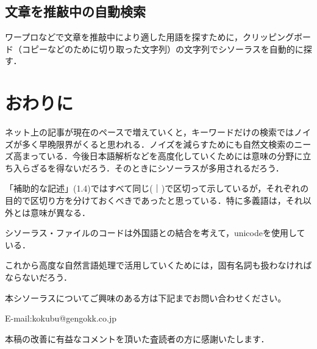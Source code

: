 \documentclass[japanese]{jnlp_1.4}
\begin{document}
\subsection{文章を推敲中の自動検索}

ワープロなどで文章を推敲中により適した用語を探すために，クリッピングボード（コピーなどのために切り取った文字列）の文字列でシソーラスを自動的に探す．


\section{おわりに}

ネット上の記事が現在のペースで増えていくと，キーワードだけの検索ではノイズが多く早晩限界がくると思われる．ノイズを減らすためにも自然文検索のニーズ高まっている．今後日本語解析などを高度化していくためには意味の分野に立ち入らざるを得ないだろう．そのときにシソーラスが多用されるだろう．

「補助的な記述」(1.4)ではすべて同じ(｜)で区切って示しているが，それぞれの目的で区切り方を分けておくべきであったと思っている．特に多義語は，それ以外とは意味が異なる．

シソーラス・ファイルのコードは外国語との結合を考えて，unicodeを使用している．

これから高度な自然言語処理で活用していくためには，固有名詞も扱わなければならないだろう．

本シソーラスについてご興味のある方は下記までお問い合わせください。

E-mail:kokubu@gengokk.co.jp

\acknowledgment

本稿の改善に有益なコメントを頂いた査読者の方に感謝いたします．
\end{document}
